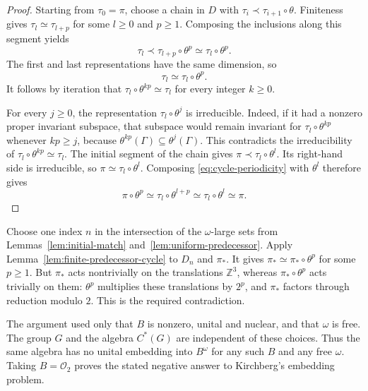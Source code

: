 \begin{proof}
Starting from $\tau_0=\pi$, choose a chain in $D$ with
$\tau_i\prec\tau_{i+1}\circ\theta$.  Finiteness gives
$\tau_l\simeq\tau_{l+p}$ for some $l\geq0$ and $p\geq1$.
Composing the inclusions along this segment yields
\[
 \tau_l\prec\tau_{l+p}\circ\theta^p
 \simeq\tau_l\circ\theta^p.
\]
The first and last representations have the same dimension, so
\begin{equation}
 \tau_l\simeq\tau_l\circ\theta^p.
 \label{eq:cycle-periodicity}
\end{equation}
It follows by iteration that $\tau_l\circ\theta^{kp}\simeq\tau_l$
for every integer $k\geq0$.

For every $j\geq0$, the representation $\tau_l\circ\theta^j$ is
irreducible.  Indeed, if it had a nonzero proper invariant subspace,
that subspace would remain invariant for
$\tau_l\circ\theta^{kp}$ whenever $kp\geq j$, because
$\theta^{kp}(\Gamma)\subseteq\theta^j(\Gamma)$.  This contradicts
the irreducibility of $\tau_l\circ\theta^{kp}\simeq\tau_l$.
The initial segment of the chain gives
$\pi\prec\tau_l\circ\theta^l$.  Its right-hand side is irreducible,
so $\pi\simeq\tau_l\circ\theta^l$.  Composing
\eqref{eq:cycle-periodicity} with $\theta^l$ therefore gives
\[
 \pi\circ\theta^p
 \simeq\tau_l\circ\theta^{l+p}
 \simeq\tau_l\circ\theta^l
 \simeq\pi.
\]
\end{proof}

Choose one index $n$ in the intersection of the $\omega$-large sets
from Lemmas~\ref{lem:initial-match} and~\ref{lem:uniform-predecessor}.
Apply Lemma~\ref{lem:finite-predecessor-cycle} to $D_n$ and $\pi_*$.
It gives $\pi_*\simeq\pi_*\circ\theta^p$ for some $p\geq1$.
But $\pi_*$ acts nontrivially on the translations $\mathbb Z^3$,
whereas $\pi_*\circ\theta^p$ acts trivially on them: $\theta^p$
multiplies these translations by $2^p$, and $\pi_*$ factors through
reduction modulo $2$.  This is the required contradiction.

The argument used only that $B$ is nonzero, unital and nuclear, and
that $\omega$ is free.  The group $G$ and the algebra $C^*(G)$ are
independent of these choices.  Thus the same algebra has no unital
embedding into $B^\omega$ for any such $B$ and any free $\omega$.
Taking $B=\mathcal O_2$ proves the stated negative answer to
Kirchberg's embedding problem.
